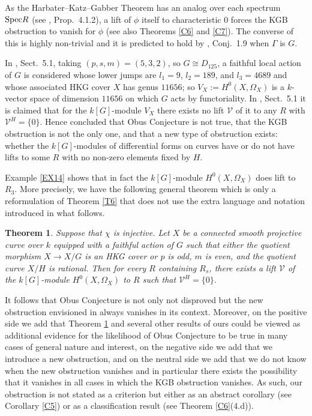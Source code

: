 \documentclass[11pt]{amsart}
\newtheorem{theorem}{Theorem}[section]
\def\Spec{\textup{Spec}}
\begin{document}
As the Harbater--Katz--Gabber Theorem has an analog over each spectrum $\Spec R$ (see \cite{K}, Prop.\ 4.1.2), a lift of $\phi$ itself to characteristic $0$ forces the KGB obstruction to vanish for $\phi$ (see also Theorems \ref{C6} and \ref{C7}). The converse of this is highly non-trivial and it is predicted to hold by \cite{O3}, Conj.\ 1.9 when $\Gamma$ is $G$.

In \cite{KT2}, Sect.\ 5.1, taking $(p,s,m)=(5,3,2)$, so $G\cong D_{125}$, a faithful local action of $G$ is considered whose lower jumps are $l_1=9$, $l_2=189$, and $l_3=4689$ and whose associated HKG cover $X$ has genus $11656$; so $V_X:=H^0(X,\Omega_X)$ is a $k$-vector space of dimension $11656$ on which $G$ acts by functoriality. In \cite{KT2}, Sect.\ 5.1 it is claimed that for the $k[G]$-module $V_X$ there exists no lift $\mathcal V$ of it to any $R$ with $\mathcal V^H=\{0\}$. Hence \cite{KT2} concluded that Obus Conjecture is not true, that the KGB obstruction is not the only one, and that a new type of obstruction exists: whether the $k[G]$-modules of differential forms on curves have or do not have lifts to some $R$ with no non-zero elements fixed by $H$.

Example \ref{EX14} shows that in fact the $k[G]$-module $H^0(X,\Omega_X)$ does lift to $R_3$. More precisely, we have the following general theorem which is only a reformulation of Theorem \ref{T6} that does not use the extra language and notation introduced in what follows.

\begin{theorem}\label{T1}
Suppose that $\chi$ is injective. Let $X$ be a connected smooth projective curve over $k$ equipped with a faithful action of $G$ such that either the quotient morphism $X\rightarrow X/G$ is an HKG cover or $p$ is odd, $m$ is even, and the quotient curve $X/H$ is rational. Then for every $R$ containing $R_s$, there exists a lift $\mathcal V$ of the $k[G]$-module $H^0(X,\Omega_X)$ to $R$ such that $\mathcal V^H=\{0\}$.
\end{theorem}

It follows that Obus Conjecture is not only not disproved but the new obstruction envisioned in \cite{KT2} always vanishes in its context. Moreover, on the positive side we add that Theorem \ref{T1} and several other results of ours could be viewed as additional evidence for the likelihood of Obus Conjecture to be true in many cases of general nature and interest, on the negative side we add that we introduce a new obstruction, and on the neutral side we add that we do not know when the new obstruction vanishes and in particular there exists the possibility that it vanishes in all cases in which the KGB obstruction vanishes. As such, our obstruction is not stated as a criterion but either as an abstract corollary (see Corollary \ref{C5}) or as a classification result (see Theorem \ref{C6}(4.d)).
\end{document}
